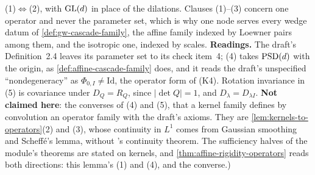 \begin{lemma}
{(1)$\Leftrightarrow$(2), with $\mathrm{GL}(d)$ in place of the dilations. Clauses (1)--(3) concern one
operator and never the parameter set, which is why one node serves every wedge datum of
\ref{def:gw-cascade-family}, the affine family indexed by Loewner pairs among them, and the isotropic
one, indexed by scales. \textbf{Readings.} The draft's
Definition~2.4 leaves its parameter set to its check item~4; (4) takes $\mathrm{PSD}(d)$ with the origin,
as \ref{def:affine-cascade-family} does, and it reads the draft's unspecified
``nondegeneracy'' as $\Phi_{0,I} \ne \mathrm{Id}$, the operator form of (K4). Rotation invariance
in (5) is covariance under $D_Q = R_Q$, since $|\det Q| = 1$, and $D_\lambda = D_{\lambda I}$.
\textbf{Not claimed here}: the converses of (4) and (5), that a kernel family defines by convolution
an operator family with the draft's axioms. They are \ref{lem:kernels-to-operators}(2) and (3),
whose continuity in $L^1$ comes from Gaussian smoothing and Scheff\'e's lemma, without \Levy's
continuity theorem. The sufficiency halves of the module's theorems are stated on kernels, and
\ref{thm:affine-rigidity-operators} reads both directions: this lemma's (1) and (4), and the
converse.)}
\end{lemma}

